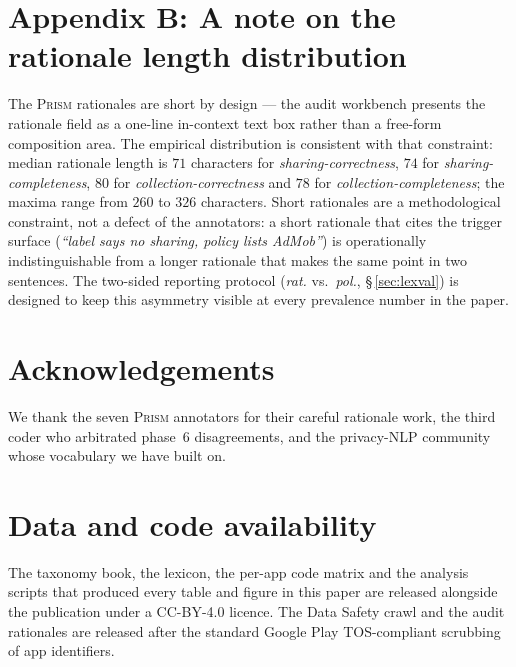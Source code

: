 \documentclass[11pt,a4paper]{article}
\newcommand{\prism}{\textsc{Prism}}
\begin{document}
\section*{Appendix B: A note on the rationale length distribution}

The \prism{} rationales are short by design --- the audit
workbench presents the rationale field as a one-line in-context text
box rather than a free-form composition area. The empirical
distribution is consistent with that constraint: median rationale
length is $71$ characters for \emph{sharing-correctness},
$74$ for \emph{sharing-completeness}, $80$ for \emph{collection-correctness}
and $78$ for \emph{collection-completeness}; the maxima range from
$260$ to $326$ characters. Short rationales are a methodological
constraint, not a defect of the annotators: a short rationale that
cites the trigger surface (\emph{``label says no sharing, policy lists
AdMob''}) is operationally indistinguishable from a longer rationale
that makes the same point in two sentences. The two-sided reporting
protocol (\emph{rat.} vs.\ \emph{pol.}, \S\,\ref{sec:lexval}) is
designed to keep this asymmetry visible at every prevalence number
in the paper.

\section*{Acknowledgements}
We thank the seven \prism{} annotators for their careful
rationale work, the third coder who arbitrated phase~$6$
disagreements, and the privacy-NLP community whose vocabulary we
have built on.

\section*{Data and code availability}
The taxonomy book, the lexicon, the per-app code matrix and the
analysis scripts that produced every table and figure in this paper
are released alongside the publication under a CC-BY-4.0 licence.
The Data Safety crawl and the audit rationales are released after
the standard Google Play TOS-compliant scrubbing of app identifiers.


\end{document}
